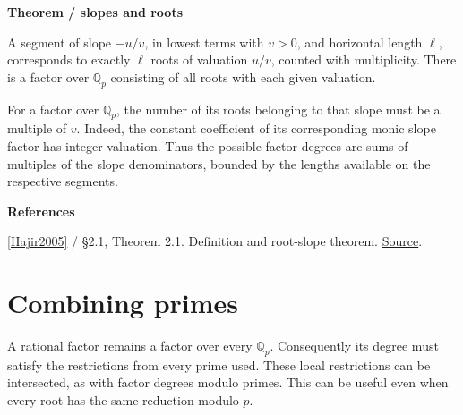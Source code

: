 \documentclass[11pt,a4paper,oneside,openany]{book}
\newenvironment{sources}{\par\smallskip\begingroup\footnotesize\color{atlasgray}\leftskip=10pt\setlength{\parskip}{2pt}}{\par\endgroup\smallskip}
\begin{document}
\begin{atlasblock}[standard]
\textbf{\sffamily Theorem  /  slopes and roots}\par\smallskip
\color{black} A segment of slope \(-u/v\), in lowest terms with \(v>0\), and horizontal length \(\ell\), corresponds to exactly \(\ell\) roots of valuation \(u/v\), counted with multiplicity. There is a factor over \(\mathbb Q_p\) consisting of all roots with each given valuation.\par
\end{atlasblock}\color{black}

\color{black} For a factor over \(\mathbb Q_p\), the number of its roots belonging to that slope must be a multiple of \(v\). Indeed, the constant coefficient of its corresponding monic slope factor has integer valuation. Thus the possible factor degrees are sums of multiples of the slope denominators, bounded by the lengths available on the respective segments.\par
\begin{sources}
\textbf{References}\par\smallskip
\noindent\hyperlink{ref:Hajir2005}{[Hajir2005]} / §2.1, Theorem 2.1. Definition and root-slope theorem. \href{https://jtnb.centre-mersenne.org/item/JTNB_2005__17_2_517_0/}{Source}.\par
\end{sources}\color{black}
\section{Combining primes}
\color{black} A rational factor remains a factor over every \(\mathbb Q_p\). Consequently its degree must satisfy the restrictions from every prime used. These local restrictions can be intersected, as with factor degrees modulo primes. This can be useful even when every root has the same reduction modulo \(p\).\par
\end{document}
